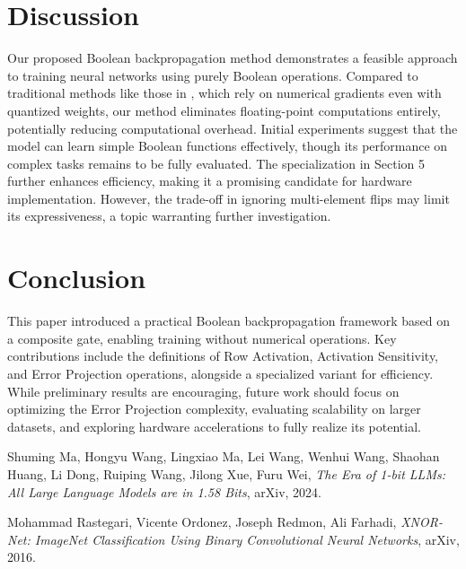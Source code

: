 \documentclass{article}
\theoremstyle{definition}
\theoremstyle{remark}
\begin{document}
\section{Discussion}
Our proposed Boolean backpropagation method demonstrates a feasible approach to training neural networks using purely Boolean operations. Compared to traditional methods like those in \cite{rastegari2016}, which rely on numerical gradients even with quantized weights, our method eliminates floating-point computations entirely, potentially reducing computational overhead. Initial experiments suggest that the model can learn simple Boolean functions effectively, though its performance on complex tasks remains to be fully evaluated. The specialization in Section 5 further enhances efficiency, making it a promising candidate for hardware implementation. However, the trade-off in ignoring multi-element flips may limit its expressiveness, a topic warranting further investigation.

\section{Conclusion}
This paper introduced a practical Boolean backpropagation framework based on a composite gate, enabling training without numerical operations. Key contributions include the definitions of Row Activation, Activation Sensitivity, and Error Projection operations, alongside a specialized variant for efficiency. While preliminary results are encouraging, future work should focus on optimizing the Error Projection complexity, evaluating scalability on larger datasets, and exploring hardware accelerations to fully realize its potential.

\begin{thebibliography}{9}
    Shuming Ma, Hongyu Wang, Lingxiao Ma, Lei Wang, Wenhui Wang, Shaohan Huang, Li Dong, Ruiping Wang, Jilong Xue, Furu Wei, \textit{The Era of 1-bit LLMs: All Large Language Models are in 1.58 Bits}, arXiv, 2024.

    Mohammad Rastegari, Vicente Ordonez, Joseph Redmon, Ali Farhadi, \textit{XNOR-Net: ImageNet Classification Using Binary Convolutional Neural Networks}, arXiv, 2016.
\end{thebibliography}
\end{document}
